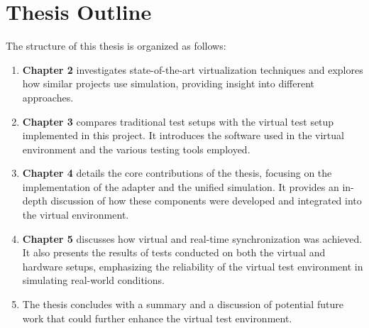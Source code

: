 \section{Thesis Outline}
The structure of this thesis is organized as follows:
\begin{enumerate}
\item \textbf{Chapter 2} investigates state-of-the-art virtualization techniques and explores how similar projects use simulation, providing insight into different approaches.
\item \textbf{Chapter 3} compares traditional test setups with the virtual test setup implemented in this project. It introduces the software used in the virtual environment and the various testing tools employed.
\item \textbf{Chapter 4} details the core contributions of the thesis, focusing on the implementation of the adapter and the unified simulation. It provides an in-depth discussion of how these components were developed and integrated into the virtual environment.
\item \textbf{Chapter 5} discusses how virtual and real-time synchronization was achieved. It also presents the results of tests conducted on both the virtual and hardware setups, emphasizing the reliability of the virtual test environment in simulating real-world conditions.
\item The thesis concludes with a summary and a discussion of potential future work that could further enhance the virtual test environment.
\end{enumerate}
